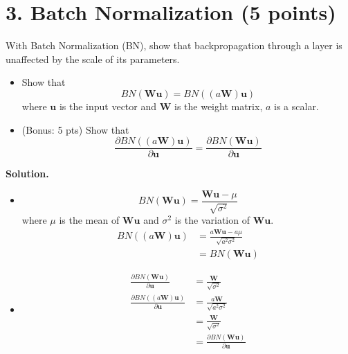 \documentclass[12pt]{article}%
\begin{document}
	\newpage
	\section*{3. Batch Normalization (5 points)}
	With Batch Normalization (BN), show that backpropagation through a layer is unaffected by the scale of its parameters. 
	\begin{itemize}
		\item Show that \[BN(\mathbf{Wu})=BN((a\mathbf{W})\mathbf{u})\] where $\mathbf{u}$ is the input vector and $\mathbf{W}$ is the weight matrix, $a$ is a scalar. 
		\item (Bonus: 5 pts) Show that 
		\[\frac{\partial BN((a\mathbf{W})\mathbf{u})}{\partial \mathbf{u}}=\frac{\partial BN(\mathbf{W}\mathbf{u})}{\partial \mathbf{u}}\]
	\end{itemize}
	\textbf{Solution.}
	\begin{itemize}
		\item 
		\[ BN(\mathbf{Wu}) = \frac{\mathbf{Wu} - \mu}{\sqrt{\sigma^2}} \]
		where $\mu$ is the mean of $\mathbf{Wu}$ and $\sigma^2$ is the variation of $\mathbf{Wu}$.
		\begin{align*}
			BN((a\mathbf{W})\mathbf{u}) &= \frac{a\mathbf{Wu} - a\mu}{\sqrt{a^2\sigma^2}} \\
			& = BN(\mathbf{Wu})
		\end{align*}
		\item
		\begin{align*}
			\frac{\partial BN(\mathbf{Wu})}{\partial \mathbf{u}} & = \frac{\mathbf{W}}{\sqrt{\sigma^2}} \\
			\frac{\partial BN((a\mathbf{W})\mathbf{u})}{\partial \mathbf{u}} & = \frac{a\mathbf{W}}{\sqrt{a^2\sigma^2}} \\
			&= \frac{\mathbf{W}}{\sqrt{\sigma^2}} \\
			&= \frac{\partial BN(\mathbf{Wu})}{\partial \mathbf{u}}
		\end{align*}
		
	\end{itemize}
	
	
	
\end{document}
